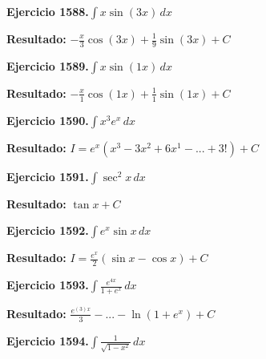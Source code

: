 \documentclass[10pt,a4paper]{article}
\begin{document}
\newpage
\begin{ejbox}
\textbf{Ejercicio 1588.}\quad $\int x \sin(3x)\,dx$
\end{ejbox}

\begin{solbox}
\textbf{Resultado:} \(\displaystyle -\frac{x}{3}\cos(3x) + \frac{1}{9}\sin(3x) + C\)
\end{solbox}

\begin{ejbox}
\textbf{Ejercicio 1589.}\quad $\int x \sin(1x)\,dx$
\end{ejbox}

\begin{solbox}
\textbf{Resultado:} \(\displaystyle -\frac{x}{1}\cos(1x) + \frac{1}{1}\sin(1x) + C\)
\end{solbox}

\begin{ejbox}
\textbf{Ejercicio 1590.}\quad $\int x^{3} e^x\,dx$
\end{ejbox}

\begin{solbox}
\textbf{Resultado:} \(\displaystyle I = e^x(x^{3} - 3x^{2} + 6x^{1} - ... + 3!) + C\)
\end{solbox}

\newpage
\begin{ejbox}
\textbf{Ejercicio 1591.}\quad $\int \sec^2 x\,dx$
\end{ejbox}

\begin{solbox}
\textbf{Resultado:} \(\displaystyle \tan x + C\)
\end{solbox}

\begin{ejbox}
\textbf{Ejercicio 1592.}\quad $\int e^x\sin x\,dx$
\end{ejbox}

\begin{solbox}
\textbf{Resultado:} \(\displaystyle I = \frac{e^x}{2}(\sin x - \cos x) + C\)
\end{solbox}

\begin{ejbox}
\textbf{Ejercicio 1593.}\quad $\int \frac{e^{4x}}{1+e^{x}}\,dx$
\end{ejbox}

\begin{solbox}
\textbf{Resultado:} \(\displaystyle \frac{e^{(3)x}}{3} - ... - \ln(1+e^x) + C\)
\end{solbox}

\newpage
\begin{ejbox}
\textbf{Ejercicio 1594.}\quad $\int \frac{1}{\sqrt{1-x^2}}\,dx$
\end{ejbox}
\end{document}
